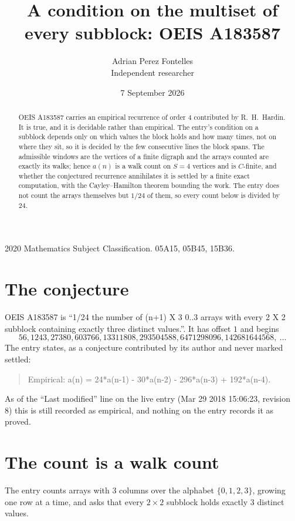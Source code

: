 \documentclass[11pt,a4paper]{article}
\title{A condition on the multiset of every subblock: OEIS A183587}
\author{Adrian Perez Fontelles\\ \small Independent researcher}
\date{7 September 2026}
\theoremstyle{plain}
\theoremstyle{definition}
\begin{document}
\maketitle

\begin{abstract}
OEIS A183587 carries an empirical recurrence of order $4$ contributed by R.~H.~Hardin. It is
true, and it is decidable rather than empirical. The entry's condition on a subblock depends
only on which values the block holds and how many times, not on where they sit, so it is
decided by the few consecutive lines the block spans. The admissible windows are the vertices
of a finite digraph and the arrays counted are exactly its walks; hence $a(n)$ is a walk count
on $S=4$ vertices and is $C$-finite, and whether the conjectured recurrence annihilates it
is settled by a finite exact computation, with the Cayley--Hamilton theorem bounding the
work. The entry does not count the arrays themselves but $1/24$ of them, so every count below is divided by $24$.
\end{abstract}

\noindent\small 2020 Mathematics Subject Classification. 05A15, 05B45, 15B36.\normalsize

\section{The conjecture}

OEIS A183587 is ``1/24 the number of (n+1) X 3 0..3 arrays with every 2 X 2 subblock containing exactly three distinct values.''. It has offset $1$ and begins
\[
56, 1243, 27380, 603766, 13311808, 293504588, 6471298096, 142681644568,\ \dots
\]
The entry states, as a conjecture contributed by its author and never marked settled:
\begin{quote}
Empirical: a(n) = 24*a(n-1) - 30*a(n-2) - 296*a(n-3) + 192*a(n-4).
\end{quote}
As of the ``Last modified'' line on the live entry (Mar 29 2018 15:06:23, revision 8) this is still
recorded as empirical, and nothing on the entry records it as proved.

\section{The count is a walk count}

The entry counts arrays with $3$ columns over the alphabet $\{0,1,2,3\}$, growing one row at a time, and asks that every $2\times2$ subblock holds exactly $3$ distinct values.
\end{document}
